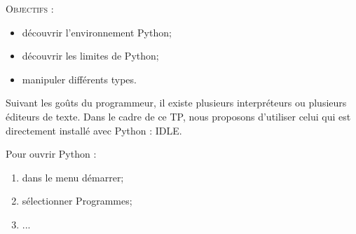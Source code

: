 \documentclass[11pt,oneside]{article}
\begin{document}
\vspace{.5cm}








\begin{savoir}
\textsc{Objectifs :}
\begin{itemize}
\item découvrir l'environnement Python;
\item découvrir les limites de Python;
\item manipuler différents types.
\end{itemize}
\end{savoir}
 



\begin{rem}
Suivant les goûts du programmeur, il existe plusieurs interpréteurs ou plusieurs éditeurs de texte. Dans le cadre de ce TP, nous proposons d'utiliser celui qui est directement installé avec Python : IDLE.
\end{rem}

Pour ouvrir Python :
\begin{enumerate}
\item dans le menu démarrer;
\item sélectionner Programmes;
\item ...
\end{enumerate}

\vspace{.5cm}
\end{document}
